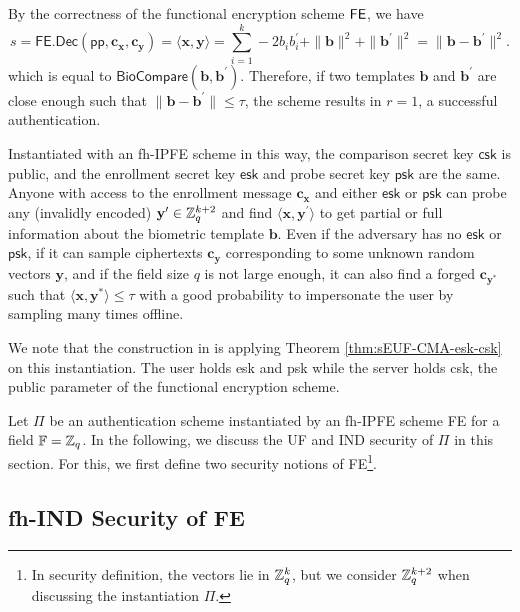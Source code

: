 By the correctness of the functional encryption scheme $\sf FE$, we have
\[
	s = \textsf{FE.Dec}(\textsf{pp}, \mathbf{c_x}, \mathbf{c_y}) = \langle \mathbf{x}, \mathbf{y} \rangle = \sum_{i=1}^k -2b_ib_i^\prime + \|\mathbf{b}\|^2 + \|\mathbf{b}^\prime\|^2 = \| \mathbf{b} - \mathbf{b}^\prime \|^2.
\]
which is equal to $\textsf{BioCompare}(\mathbf{b}, \mathbf{b}^\prime)$. Therefore, if two templates $\mathbf{b}$ and $\mathbf{b}^\prime$ are close enough such that $\|\mathbf{b} - \mathbf{b}^\prime\| \leq \tau$, the scheme results in $r = 1$, a successful authentication.

Instantiated with an fh-IPFE scheme in this way, the comparison secret key $\textsf{csk}$ is public, and the enrollment secret key $\textsf{esk}$ and probe secret key $\textsf{psk}$ are the same. Anyone with access to the enrollment message $\mathbf{c_x}$ and either $\textsf{esk}$ or $\textsf{psk}$ can probe any (invalidly encoded) $\mathbf{y}^{\prime} \in \mathbb{Z}_q^{k+2}$ and find $\langle \mathbf{x}, {\mathbf{y}^\prime} \rangle$ to get partial or full information about the biometric template $\mathbf{b}$. Even if the adversary has no $\textsf{esk}$ or $\textsf{psk}$, if it can sample ciphertexts $\mathbf{c_{y}}$ corresponding to some unknown random vectors $\mathbf{y}$, and if the field size $q$ is not large enough, it can also find a forged $\mathbf{c_{y^*}}$ such that $\langle \mathbf{x}, \mathbf{y^*} \rangle \leq \tau$ with a good probability to impersonate the user by sampling many times offline.

We note that the construction in \cite{cryptoeprint:2023/481} is applying Theorem \ref{thm:sEUF-CMA-esk-csk} on this instantiation. The user holds \textsf{esk} and \textsf{psk} while the server holds \textsf{csk}, the public parameter of the functional encryption scheme.

Let $\Pi$ be an authentication scheme instantiated by an fh-IPFE scheme \textsf{FE} for a field $\mathbb{F} = \mathbb{Z}_q$. In the following, we discuss the UF and IND security of $\Pi$ in this section. For this, we first define two security notions of \textsf{FE}\footnote{In security definition, the vectors lie in $\mathbb{Z}_q^k$, but we consider $\mathbb{Z}_q^{k+2}$ when discussing the instantiation $\Pi$.}.


\subsection{fh-IND Security of \textsf{FE}}

